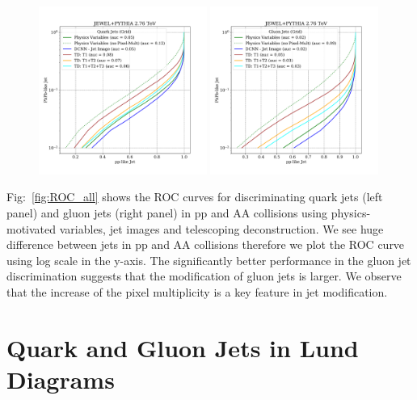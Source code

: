 \documentclass[notoc]{JHEP3}
\begin{document}
\begin{figure}
	   \centering
	   \includegraphics[width=0.49\textwidth]{plots/JEWELPYTHIA_2p76TeV_quark_ppvspbpb.pdf}
	   \includegraphics[width=0.49\textwidth]{plots/JEWELPYTHIA_2p76TeV_gluon_ppvspbpb.pdf}
	   \caption{}
\label{fig:ROC_qq_gg}
\end{figure}
Fig:~\ref{fig:ROC_all} shows the ROC curves for discriminating quark jets (left panel) and gluon jets (right panel) in pp and AA collisions using physics-motivated variables, jet images and telescoping deconstruction. We see huge difference between jets in pp and AA collisions therefore we plot the ROC curve using log scale in the y-axis. The significantly better performance in the gluon jet discrimination suggests that the modification of gluon jets is larger. We observe that the increase of the pixel multiplicity is a key feature in jet modification.

\section{Quark and Gluon Jets in Lund Diagrams}
\label{sec:lund}
\end{document}
